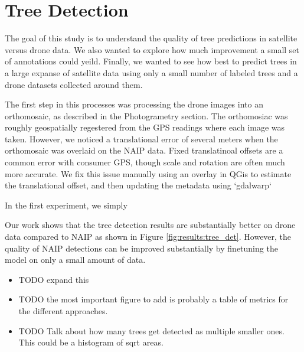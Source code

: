 \section{Tree Detection}
The goal of this study is to understand the quality of tree predictions in satellite versus drone data. We also wanted to explore how much improvement a small set of annotations could yeild. Finally, we wanted to see how best to predict trees in a large expanse of satellite data using only a small number of labeled trees and a drone datasets collected around them.

The first step in this processes was processing the drone images into an orthomosaic, as described in the Photogrametry section. The orthomosiac was roughly geospatially regestered from the GPS readings where each image was taken. However, we noticed a translational error of several meters when the orthomosaic was overlaid on the NAIP data. Fixed translatinoal offsets are a common error with consumer GPS, though scale and rotation are often much more accurate. We fix this issue manually using an overlay in QGis to estimate the translational offset, and then updating the metadata using `gdalwarp`  


In the first experiment, we simply


Our work shows that the tree detection results are substantially better on drone data compared to NAIP as shown in Figure \ref{fig:results:tree_det}. However, the quality of NAIP detections can be improved substantially by finetuning the model on only a small amount of data.

\begin{itemize}
    \item TODO expand this
    \item TODO the most important figure to add is probably a table of metrics for the different approaches.
    \item TODO Talk about how many trees get detected as multiple smaller ones. This could be a histogram of sqrt areas. 
\end{itemize}

